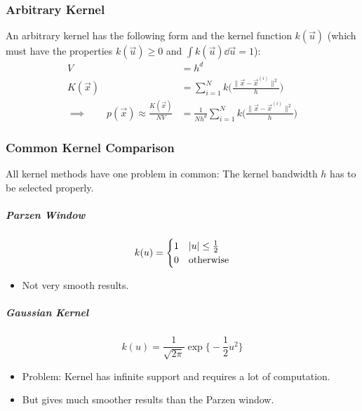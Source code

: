 			\subsubsection{Arbitrary Kernel}
				An arbitrary kernel has the following form and the kernel function \( k(\vec{u}) \) (which must have the properties \( k(\vec{u}) \geq 0 \) and \( \int k(\vec{u}) \dd{\vec{u}} = 1 \)):
				\begin{align}
					V                                                       & = h^d                                                                                              \\
					K(\vec{x})                                              & = \sum_{i = 1}^{N} k\Bigg( \frac{\lVert \vec{x} - \vec{x}^{(i)} \rVert^2}{h} \Bigg)                \\
					\implies\qquad p(\vec{x}) \approx \frac{K(\vec{x})}{NV} & = \frac{1}{Nh^d} \sum_{i = 1}^{N} k\Bigg( \frac{\lVert \vec{x} - \vec{x}^{(i)} \rVert^2}{h} \Bigg)
				\end{align}

			\subsubsection{Common Kernel Comparison}
				All kernel methods have one problem in common: The kernel bandwidth \(h\) has to be selected properly.

				\subparagraph{Parzen Window}
					\begin{equation}
						k(u) =
						\begin{cases}
							1 & \abs{u} \leq \frac{1}{2} \\
							0 & \textrm{otherwise}
						\end{cases}
					\end{equation}
					\begin{itemize}
						\item Not very smooth results.
					\end{itemize}

				\subparagraph{Gaussian Kernel}
					\begin{equation}
						k(u) = \frac{1}{\sqrt{2\pi}} \exp\Bigg\{ -\frac{1}{2} u^2 \Bigg\}
					\end{equation}
					\begin{itemize}
						\item Problem: Kernel has infinite support and requires a lot of computation.
						\item But gives much smoother results than the Parzen window.
					\end{itemize}

